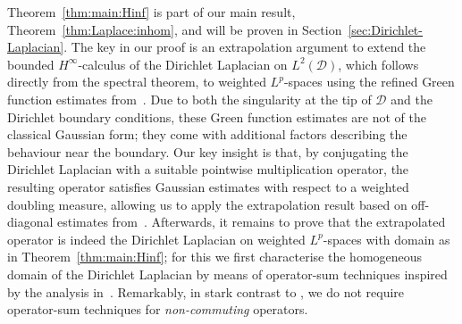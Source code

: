 \documentclass[12pt,a4paper, reqno]{amsart}
\theoremstyle{plain}
\theoremstyle{definition}
\theoremstyle{remark}
\numberwithin{equation}{section}
\newcommand{\1}{\mathbbm{1}}
\newcommand{\calD}{\ensuremath{\mathcal{D}}}
\begin{document}
Theorem~\ref{thm:main:Hinf} is part of our main result, Theorem~\ref{thm:Laplace:inhom}, and will be proven in Section~\ref{sec:Dirichlet-Laplacian}.
The key in our proof is an extrapolation argument to extend the bounded $H^\infty$-calculus of the Dirichlet Laplacian on  $L^2(\calD)$, which follows directly from the spectral theorem, to weighted $L^p$-spaces using the refined Green function estimates from~\cite{KimLeeSeoRefinedGreenCone}. Due to both the singularity at the tip of $\calD$ and the Dirichlet boundary conditions, these Green function estimates are not of the classical Gaussian form;  they come with additional factors describing the behaviour near the boundary. Our key insight is that, by conjugating the Dirichlet Laplacian with a suitable pointwise multiplication operator, the resulting operator satisfies Gaussian estimates with respect to a weighted doubling measure, allowing us to apply the extrapolation result based on off-diagonal estimates from~\cite{BernicotFreyPetermichl_2016}. Afterwards, it remains to prove that the extrapolated operator is indeed the Dirichlet Laplacian on weighted $L^p$-spaces with domain as in Theorem~\ref{thm:main:Hinf}; for this we first characterise the  homogeneous domain of the Dirichlet Laplacian by means of operator-sum techniques inspired by the analysis in~\cite[Section~5]{Prss2007HinftycalculusFT}. Remarkably, in stark contrast to \cite{Prss2007HinftycalculusFT}, we do not require operator-sum techniques for \emph{non-commuting} operators. 

\medskip
\end{document}
